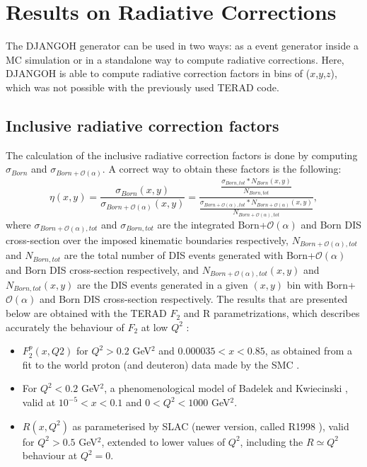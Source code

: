 
\chapter{Results on Radiative Corrections} %

\label{ch:RC} %


The DJANGOH generator can be used in two ways: as a event generator inside a MC simulation or in a standalone way to compute radiative corrections. Here, DJANGOH is able to compute radiative correction factors in bins of ($x$,$y$,$z$), which was not possible with the previously used TERAD code.

\section{Inclusive radiative correction factors}\label{sec:RCF}

The calculation of the inclusive radiative correction factors is done by computing $\sigma_{Born}$ and $\sigma_{Born+\mathscr{O}(\alpha)}$. A correct way to obtain these factors is the following:
%
\begin{equation}
  \eta(x,y)=\frac{\sigma_{Born}(x,y)}{\sigma_{Born+\mathscr{O}(\alpha)}(x,y)}
  =\frac{\frac{\sigma_{Born,tot}*N_{Born}(x,y)}{N_{Born,tot}}}{\frac{\sigma_{Born+\mathscr{O}(\alpha),tot}*N_{Born+\mathscr{O}(\alpha)}(x,y)}{N_{Born+\mathscr{O}(\alpha),tot}}},
\end{equation}
%
where $\sigma_{Born+\mathscr{O}(\alpha),tot}$ and $\sigma_{Born,tot}$ are the integrated Born+$\mathscr{O}(\alpha)$ and Born DIS cross-section over the imposed kinematic boundaries respectively, $N_{Born+\mathscr{O}(\alpha),tot}$ and $N_{Born,tot}$ are the total number of DIS events generated with Born+$\mathscr{O}(\alpha)$ and Born DIS cross-section respectively, and $N_{Born+\mathscr{O}(\alpha),tot}(x,y)$ and $N_{Born,tot}(x,y)$ are the DIS events generated in a given $(x,y)$ bin with Born+$\mathscr{O}(\alpha)$ and Born DIS cross-section respectively. The results that are presented below are obtained with the TERAD $F_{2}$ and R parametrizations, which describes accurately the behaviour of $F_{2}$ at low $Q^{2}$ \cite{BPnote}:

\begin{itemize}
\item $F^{p}_{2}(x,Q2)$ for $Q^2 > 0.2$ GeV$^2$ and $0.000035 < x < 0.85$, as obtained from a fit to the
world proton (and deuteron) data made by the SMC \cite{SMC}.
\item For $Q^2 < 0.2$ GeV$^2$, a phenomenological model of Badelek and Kwiecinski \cite{BK}, valid at $10^{-5} < x < 0.1$
and $0 < Q^2 < 1000$ GeV$^2$.
\item $R(x, Q^2)$ as parameterised by SLAC (newer version, called R1998 \cite{R1998}), valid for $Q^2 > 0.5$ GeV$^2$, extended
to lower values of $Q^2$, including the $R \simeq Q^2$ behaviour at $Q^2 = 0$.
\end{itemize}

